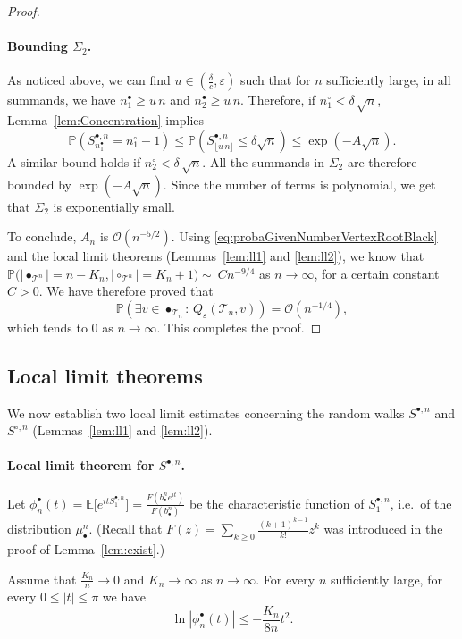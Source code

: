\documentclass[AHL,XML,longabstracts,Unicode]{cedram}
\providecommand{\abs}[1]{\lvert#1\rvert}
\def\eps{\varepsilon}
\def\bbn{b_{\bullet}^{n}}
\def\mubn{\mu_{\bullet}^{n}}
\def\Sbn{S^{\bullet,n}}
\def\Scn{S^{\circ,n}}
\def\phibn{\phi^{\bullet}_{n}}
\def\Ts{\mathscr{T}}
\newcommand\Esb[1]{\mathbb{E}\big[#1\big]}
\renewcommand\Pr[1]{\mathbb{P}\left(#1\right)}
\newcommand\Prb[1]{\mathbb{P}\big(#1\big)}
\begin{document}
\begin{proof}
\paragraph*{Bounding  $\varSigma_2$.}
  As noticed above, we can find  $u \in (\tfrac{\delta}{c},\eps)$  such that for $n$ sufficiently large, in all summands, we have $n_1^\bullet \ge u\, n$ and $n_2^\bullet \ge u\, n$.
  Therefore, if $n_1^\circ < \delta\, \sqrt{n}$, Lemma~\ref{lem:Concentration} implies
  \[\Pr{\Sbn_{n^\bullet_1}=n^\circ_1-1} \le
  \Pr{\Sbn_{\lfloor u\, n \rfloor} \le \delta \sqrt{n}} \le \exp(-A \sqrt{n}).\]
  A similar bound holds if $n_2^\circ < \delta\, \sqrt{n}$.
  All the summands in $\varSigma_2$ are therefore bounded by $\exp(-A \sqrt{n})$.
  Since the number of terms is polynomial, we get that
  $\varSigma_2$ is exponentially small.


  To conclude, $A_{n}$ is $\mathcal O(n^{-5/2})$.
  Using \eqref{eq:probaGivenNumberVertexRootBlack} and the local limit theorems (Lemmas~\ref{lem:ll1} and \ref{lem:ll2}),
  we know that $\Prb{\abs{\bullet_{\Ts^{n}}}=n-K_n, \abs{\circ_{\Ts^{n}}} =K_n+1} \sim\ C n^{-9/4}$ as $n \rightarrow \infty$, for a certain constant $C>0$.
  We have therefore proved that
  \[  \Pr{\exists v \in \bullet_{\Ts_{n}}: \, Q_\eps(\Ts_{n},v)}= \mathcal O(n^{-1/4}),\]
  which tends to $0$ as $n \rightarrow \infty$.  This completes the proof.
\end{proof}



\subsection{Local limit theorems}
\label{ss:llt}

We now establish two local limit estimates concerning the random walks $\Sbn$ and $\Scn$
(Lemmas~\ref{lem:ll1} and \ref{lem:ll2}).



\paragraph*{Local limit theorem for $\Sbn$.}


Let $\phibn(t)=\Esb{e^{it\Sbn_{1}}}= \tfrac{F( \bbn e^{it})}{F(\bbn)}$  be the characteristic function of $\Sbn_{1}$,
i.e.\ of the distribution $\mubn$.
(Recall that $F(z)=\sum_{k \ge 0} \tfrac{(k+1)^{k-1}}{k!} z^k$ was introduced in the proof of Lemma~\ref{lem:exist}.)

\begin{lemma}\label{lem:phib}
Assume that $\tfrac{K_{n}}{n} \rightarrow 0$ and $K_{n} \rightarrow \infty$ as $n \rightarrow \infty$. For every $n$ sufficiently large, for every $ 0 \leq |t| \leq \pi$  we have
\begin{equation}
\label{eq:phib}  \ln | \phibn (t)| \leq -  \frac{K_{n}}{ 8n} t^{2}.
\end{equation}
\end{lemma}
\end{document}
